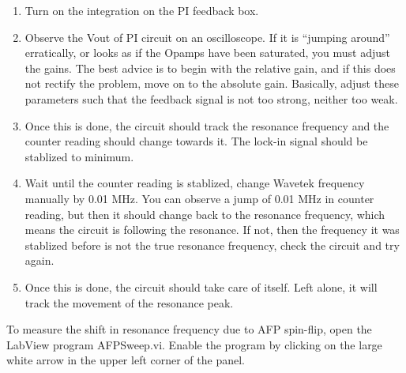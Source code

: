 \begin{enumerate}
\item Turn on the integration on the PI feedback box.

\item Observe the Vout of PI circuit on an oscilloscope.  If it is ``jumping
around'' erratically, or looks as if the  Opamps have been saturated, you
must adjust the gains.  The best advice
is to begin with the relative gain, and if this does not rectify the
problem, move on to the absolute gain. 
Basically, adjust these parameters such that the feedback signal is not too strong,
neither too weak. \\

\item Once this is done, the circuit should track
the resonance frequency and the counter reading should change towards it.  The lock-in
signal should be stablized to minimum.   

\item Wait until the counter reading is stablized, change Wavetek frequency manually
by 0.01 MHz.  You can observe a jump of 0.01 MHz in counter reading, but then
it should change back to the resonance frequency, which means the circuit is following
the resonance.  If not, then the frequency
it was stablized before is not the true resonance frequency, check the circuit and
try again.

\item Once this is done, the circuit
should take care of itself.  Left alone, it will track the movement of
the resonance peak.
\end{enumerate}        

To measure the shift in resonance frequency due to AFP spin-flip, 
open the LabView program AFPSweep.vi.  Enable the program by clicking
on the large white arrow in the upper left corner of the panel.

